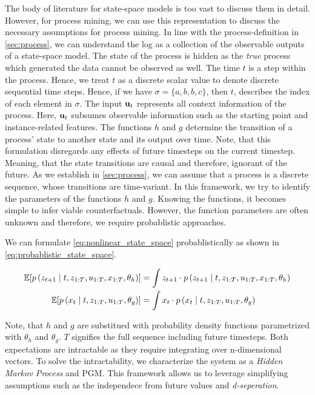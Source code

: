 \documentclass[./../../paper.tex]{subfiles}
\begin{document}
The body of literature for state-space models is too vast to discuss them in detail. 
However, for process mining, we can use this representation to discuss the necessary assumptions for process mining.
In line with the process-definition in \autoref{sec:process}, we can understand the \gls{log} as a collection of the observable outputs of a state-space model. 
The state of the process is hidden as the \emph{true} process which generated the data cannot be observed as well. The time $t$ is a step within the process. Hence, we treat $t$ as a discrete scalar value to denote discrete sequential time steps. Hence, if we have $\sigma=\{a,b,b,c\}$, then $t$, describes the index of each element in $\sigma$.  The input $\mathbf{u}_t$ represents all context information of the process. Here, $\mathbf{u}_t$ subsumes observable information such as the starting point and \gls{instance}-related features. The functions $h$ and $g$ determine the transition of a process' state to another state and its output over time. Note, that this formulation disregards any effects of future timesteps on the current timestep. Meaning, that the state transitions are causal and therefore, ignorant of the future.
As we establish in \autoref{sec:process}, we can assume that a process is a discrete sequence, whose transitions are time-variant. 
In this framework, we try to identify the parameters of the functions $h$ and $g$. Knowing the functions, it becomes simple to infer viable counterfactuals. However, the function parameters are often unknown and therefore, we require probablistic approaches.

We can formulate \autoref{eq:nonlinear_state_space} probablistically as shown in \autoref{eq:probablistic_state_space}.

\begin{align}
    \label{eq:probablistic_state_space}
    \mathbb{E}[p\left(z_{t+1} \mid t, z_{1:T}, u_{1:T}, x_{1:T}, \theta_h\right)] & =
    \int z_{t+1} \cdot p\left(z_{t+1} \mid t, z_{1:T}, u_{1:T}, x_{1:T}, \theta_h\right) \\
    \mathbb{E}[p\left(x_t \mid t, z_{1:T}, u_{1:T}, \theta_g\right)]   & =
    \int x_{t} \cdot p\left(x_t \mid t, z_{1:T}, u_{1:T}, \theta_g\right) \nonumber
\end{align}

Note, that $h$ and $g$ are substitued with probability density functions parametrized with $\theta_h$ and $\theta_g$. $T$ signifies the full sequence including future timesteps.
Both expectations are intractable as they require integrating over n-dimensional vectors. To solve the intractability, we characterize the system as a \emph{Hidden Markov Process} and \gls{PGM}. This framework allows us to leverage simplifying assumptions such as the independece from future values and \emph{d-seperation}. 
\end{document}
